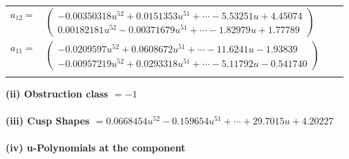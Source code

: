 \documentclass[1p]{elsarticle_modified}
\theoremstyle{definition}
\begin{document}
\begin{tabular}{m{7pt} m{180pt} m{7pt} m{180pt} }
\flushright $a_{12}=$&$\begin{pmatrix}-0.00350318 u^{52}+0.0151353 u^{51}+\cdots-5.53251 u+4.45074\\0.00182181 u^{52}-0.00371679 u^{51}+\cdots-1.82979 u+1.77789\end{pmatrix}$ \\
\flushright $a_{11}=$&$\begin{pmatrix}-0.0209597 u^{52}+0.0608672 u^{51}+\cdots-11.6241 u-1.93839\\-0.00957219 u^{52}+0.0293318 u^{51}+\cdots-5.11792 u-0.541740\end{pmatrix}$\\&\end{tabular}
\flushleft \textbf{(ii) Obstruction class $= -1$}\\~\\
\flushleft \textbf{(iii) Cusp Shapes $= 0.0668454 u^{52}-0.159654 u^{51}+\cdots+29.7015 u+4.20227$}\\~\\
\newpage\renewcommand{\arraystretch}{1}
\flushleft \textbf{(iv) u-Polynomials at the component}\newline \\
\end{document}
